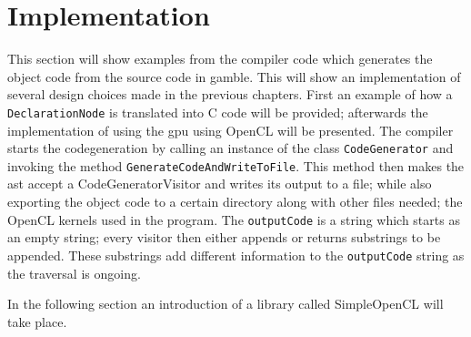 \section{Implementation}
This section will show examples from the compiler code which generates the object code from the source code in \gls{gamble}.
This will show an implementation of several design choices made in the previous chapters.
First an example of how a \texttt{DeclarationNode} is translated into C code will be provided; afterwards the implementation of using the \acrshort{gpu} using OpenCL will be presented.
The compiler starts the codegeneration by calling an instance of the class \texttt{CodeGenerator} and invoking the method \texttt{GenerateCodeAndWriteToFile}.
This method then makes the \acrshort{ast} accept a CodeGeneratorVisitor and writes its output to a file; while also exporting the object code to a certain directory along with other files needed; the OpenCL kernels used in the program.
The \texttt{outputCode} is a string which starts as an empty string; every visitor then either appends or returns substrings to be appended.
These substrings add different information to the \texttt{outputCode} string as the traversal is ongoing.



In the following section an introduction of a library called SimpleOpenCL will take place.

